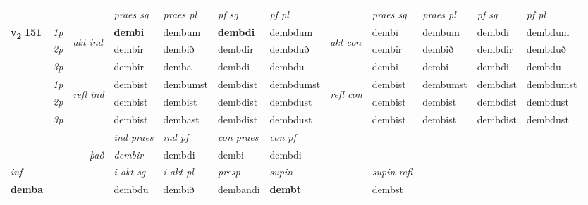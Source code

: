 \begin{longtable}[l]{X>{\footnotesize\itshape}llXXXXlXXXX}
 & &   & \textit{praes sg}  & \textit{praes pl}    & \textit{ pf sg} & \textit{pf pl} & & \textit{praes sg}  & \textit{praes pl}    & \textit{pf sg} & \textit{pf pl }  \\ \cmidrule{4-7} \cmidrule{9-12}
 \multirow{2}{*}{{{\textbf{v{\textsubscript{2}}} \Large{\textbf{151}}}}}  & 1p & \multirow{3}{*}{\begin{turn}{90}\textit{akt ind}\end{turn}} & \textbf{dembi} & dembum & \textbf{dembdi} & dembdum & \multirow{3}{*}{\begin{turn}{90}\textit{akt con}\end{turn}} &dembi & dembum & dembdi & dembdum\\*
 & 2p &  &  dembir  & dembið & dembdir & dembduð & & dembir & dembið & dembdir & dembduð \\*
 & 3p &  & dembir & demba & dembdi & dembdu & & dembi & dembi& dembdi & dembdu \\*
\cmidrule{4-7} \cmidrule{9-12}
 & 1p & \multirow{3}{*}{\begin{turn}{90}\textit{refl ind}\end{turn}}  & dembist & dembumst & dembdist & dembdumst & \multirow{3}{*}{\begin{turn}{90}\textit{refl con}\end{turn}}  &dembist & dembumst & dembdist & dembdumst \\*
 & 2p &  & dembist & dembist & dembdist & dembdust & &dembist & dembist & dembdist & dembdust \\*
 & 3p  & & dembist & dembast & dembdist & dembdust & & dembist & dembist& dembdist & dembdust \\*
\cmidrule{4-7} \cmidrule{9-12}

   && &  \textit{ind praes} & \textit{ind pf} & \textit{con praes} & \textit{con pf} \\*
\multicolumn{3}{r}{\textit{það}} & dembir & dembdi & dembi & dembdi \\*

\cmidrule{4-7}
   {\textit{inf}} & &  & \textit{i akt sg} & \textit{i akt pl}   & \textit{presp} & \textit{supin} && \textit{supin refl}  \\*
  {\textbf{demba}} & && dembdu  & dembið   & dembandi &  \textbf{dembt} && dembst  \\*

\midrule


\end{longtable}
